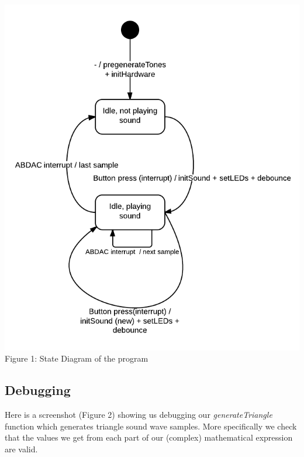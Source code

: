 \documentclass[a4paper,11pt]{article}
\begin{document}
\begin{center}
\centering
\includegraphics[scale=0.75]{images/lucid_chart.png}
\linebreak
Figure 1: State Diagram of the program
\end{center}

\newpage

\subsection*{Debugging}
Here is a screenshot (Figure 2) showing us debugging our \emph{generateTriangle} function which generates triangle sound wave samples. More specifically we check that the values we get from each part of our (complex) mathematical expression are valid. 
\end{document}
